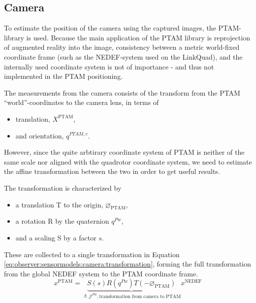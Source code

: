 \subsection{Camera}
\label{ssec:observer:sensormodels:camera}
    To estimate the position of the camera using the captured images,
    the PTAM-library is used.
    Because the main application of the PTAM library is reprojection of
    augmented reality into the image, consistency between a metric world-fixed
    coordinate frame (such as the NEDEF-system used on the LinkQuad), and the
    internally used coordinate system is not of importance - and thus not implemented in the PTAM positioning.

    The measurements from the camera consists of the transform from the PTAM ``world''-coordinates
    to the camera lens, in terms of
    \begin{itemize}
        \item translation, $X^{\text{PTAM}}$,
        \item and orientation, $q^{PTAM,c}$.
    \end{itemize}
    However, since the quite arbtirary\citep{klein07parallel} coordinate system
    of PTAM is neither of the same scale nor aligned with the quadrotor coordinate system,
    we need to estimate the affine transformation between the two in order to get useful results.

    The transformation is characterized by
    \begin{itemize}
        \item a translation T to the origin, $\varnothing_{\text{PTAM}}$,
        \item a rotation R by the quaternion $q^{Pw}$,
        \item and a scaling S by a factor $s$.
    \end{itemize}
    These are collected to a single transformation in Equation
    \ref{eq:observer:sensormodels:camera:transformation}, forming
    the full transformation from the global NEDEF system to the
    PTAM coordinate frame.
    \begin{equation}
        \label{eq:observer:sensormodels:camera:transformation}
        x^{\text{PTAM}} = \underbrace{S(s) R(q^{Pw}) T(-\varnothing_{\text{PTAM}})}_{\triangleq \mathcal{J}^{Pw}, \text{transformation from camera to PTAM}}
         x^{\text{NEDEF}}
    \end{equation}

